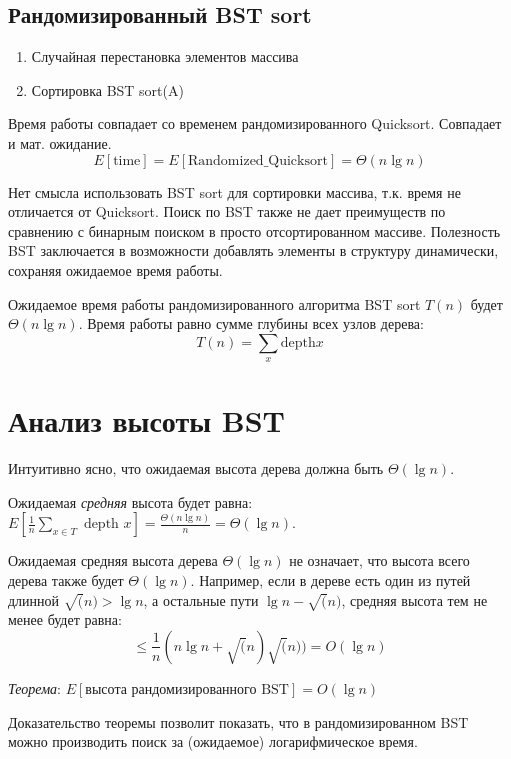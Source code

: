 \subsection{Рандомизированный BST sort}
\begin{enumerate}
\item Случайная перестановка элементов массива
\item Сортировка BST sort(A)
\end{enumerate}

Время работы совпадает со временем рандомизированного Quicksort. Совпадает и мат. ожидание.
\begin{equation*}
  E[\text{time}] = E[\text{Randomized\_Quicksort}] = \Theta(n \lg n)
\end{equation*}

Нет смысла использовать BST sort для сортировки массива, т.к. время не отличается от Quicksort. Поиск по BST также не дает преимуществ по сравнению с бинарным поиском в просто отсортированном массиве. Полезность BST заключается в возможности добавлять элементы в структуру динамически, сохраняя ожидаемое время работы.

Ожидаемое время работы рандомизированного алгоритма BST sort $T(n)$ будет $\Theta(n \lg n)$. Время работы равно сумме глубины всех узлов дерева:
\begin{equation*}
  T(n) = \sum_{x} \text{depth} x
\end{equation*}

\section{Анализ высоты BST}
Интуитивно ясно, что ожидаемая высота дерева должна быть $\Theta(\lg n)$.

Ожидаемая \emph{средняя} высота будет равна: $E[\frac{1}{n}\sum_{x \in T} \text{ depth } x] = \frac{\Theta(n \lg n)}{n} = \Theta(\lg n)$.

Ожидаемая средняя высота дерева $\Theta(\lg n)$ не означает, что высота всего дерева также будет $\Theta(\lg n)$. Например, если в дереве есть один из путей длинной $\sqrt(n) > \lg n$, а остальные пути $\lg{n - \sqrt(n)}$, средняя высота тем не менее будет равна:
\begin{equation*}
 \leqslant \frac{1}{n}(n \lg n + \sqrt(n) \sqrt(n)) = O(\lg n)
\end{equation*}

\emph{Теорема}: $E[\text{высота рандомизированного BST}] = O(\lg n)$

Доказательство теоремы позволит показать, что в рандомизированном BST можно производить поиск за (ожидаемое) логарифмическое время.

